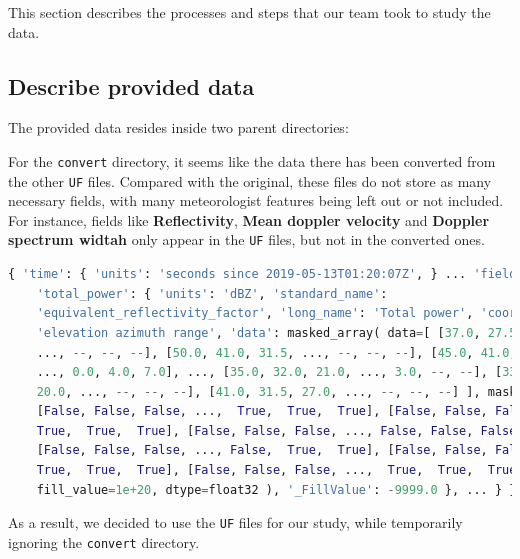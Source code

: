 This section describes the processes and steps that our team took to study the
data.

\subsection{Describe provided data}

The provided data resides inside two parent directories:



For the \texttt{convert} directory, it seems like the data there has been
converted from the other \texttt{UF} files. Compared with the original, these
files do not store as many necessary fields, with many meteorologist features
being left out or not included. For instance, fields like \textbf{Reflectivity},
\textbf{Mean doppler velocity} and \textbf{Doppler spectrum widtah} only appear
in the \texttt{UF} files, but not in the converted ones.

\begin{lstlisting}[language=python,caption={A sample of metadata extracted from UF file}]
{ 'time': { 'units': 'seconds since 2019-05-13T01:20:07Z', } ... 'fields': {
    'total_power': { 'units': 'dBZ', 'standard_name':
    'equivalent_reflectivity_factor', 'long_name': 'Total power', 'coordinates':
    'elevation azimuth range', 'data': masked_array( data=[ [37.0, 27.5, 37.5,
    ..., --, --, --], [50.0, 41.0, 31.5, ..., --, --, --], [45.0, 41.0, 29.5,
    ..., 0.0, 4.0, 7.0], ..., [35.0, 32.0, 21.0, ..., 3.0, --, --], [33.5, 27.5,
    20.0, ..., --, --, --], [41.0, 31.5, 27.0, ..., --, --, --] ], mask=[
    [False, False, False, ...,  True,  True,  True], [False, False, False, ...,
    True,  True,  True], [False, False, False, ..., False, False, False], ...,
    [False, False, False, ..., False,  True,  True], [False, False, False, ...,
    True,  True,  True], [False, False, False, ...,  True,  True,  True] ],
    fill_value=1e+20, dtype=float32 ), '_FillValue': -9999.0 }, ... } }
\end{lstlisting}


As a result, we decided to use the \texttt{UF} files for our study, while
temporarily ignoring the \texttt{convert} directory.


